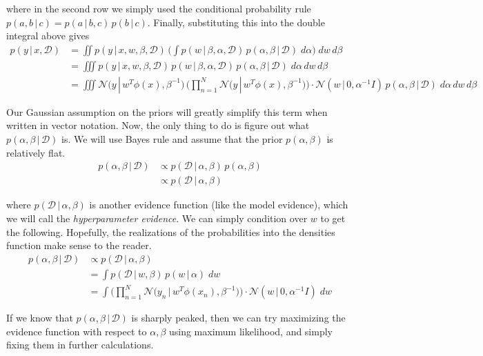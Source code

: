   where in the second row we simply used the conditional probability rule $p(a, b\,|\,c) = p(a\,|\,b, c)\, p(b\,|\,c)$. Finally, substituting this into the double integral above gives
  \begin{align*}
    p(y\,|\,x, \mathcal{D}) & = \iint p(y\,|\,x, w, \beta, \mathcal{D}) \, \bigg( \int p(w\,|\, \beta, \alpha, \mathcal{D}) \, p(\alpha, \beta\,|\,\mathcal{D}) \; d\alpha\bigg) \; dw\, d\beta \\
    & = \iiint p(y\,|\,x, w, \beta, \mathcal{D}) \, p(w\,|\, \beta, \alpha, \mathcal{D}) \, p(\alpha, \beta\,|\,\mathcal{D}) \; d\alpha \,dw\, d\beta \\
    & = \iiint \mathcal{N}\big(y\,|\, w^T \phi(x), \beta^{-1}\big)\,\bigg( \prod_{n=1}^N \mathcal{N}\big( y\,|\, w^T \phi(x), \beta^{-1} \big) \bigg) \cdot \mathcal{N}(w\,|\,0, \alpha^{-1} I)\, p(\alpha, \beta\,|\,\mathcal{D}) \; d\alpha \, dw \, d\beta
  \end{align*}



  Our Gaussian assumption on the priors will greatly simplify this term when written in vector notation. Now, the only thing to do is figure out what $p(\alpha, \beta\,|\,\mathcal{D})$ is. We will use Bayes rule and assume that the prior $p(\alpha, \beta)$ is relatively flat.
  \begin{align*}
    p(\alpha, \beta \,|\,\mathcal{D}) & \propto p( \mathcal{D}\,|\,\alpha, \beta) \, p(\alpha, \beta) \\
    & \propto p(\mathcal{D}\,|\,\alpha, \beta)
  \end{align*}

  where $p(\mathcal{D}\,|\,\alpha, \beta)$ is another evidence function (like the model evidence), which we will call the \textit{hyperparameter evidence}. We can simply condition over $w$ to get the following. Hopefully, the realizations of the probabilities into the densities function make sense to the reader.
  \begin{align*}
    p(\alpha, \beta \,|\, \mathcal{D}) & \propto p(\mathcal{D}\,|\,\alpha, \beta) \\
    & = \int p(\mathcal{D}\,|\,w, \beta) \, p(w \,|\,\alpha)\; dw \\
    & = \int \bigg(\prod_{n=1}^N \mathcal{N} \big(y_n \,|\, w^T \phi(x_n), \beta^{-1} \big)\bigg) \cdot \mathcal{N}(w\,|\, 0, \alpha^{-1} I)\; dw
  \end{align*}

  If we know that $p(\alpha, \beta \,|\,\mathcal{D})$ is sharply peaked, then we can try maximizing the evidence function with respect to $\alpha, \beta$ using maximum likelihood, and simply fixing them in further calculations.

